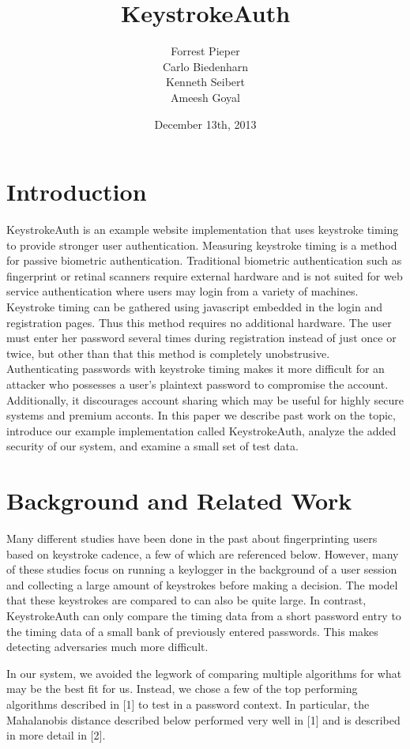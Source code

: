 \documentclass{article}
\title{KeystrokeAuth}
\author{
  Forrest Pieper\\
  Carlo Biedenharn\\
  Kenneth Seibert\\
  Ameesh Goyal
}
\date{December 13th, 2013}
\begin{document}
\maketitle

\abstract{
}

\section{Introduction}
\label{introduction}
KeystrokeAuth is an example website implementation that uses keystroke timing to provide stronger user authentication.
Measuring keystroke timing is a method for passive biometric authentication. 
Traditional biometric authentication such as fingerprint or retinal scanners require external hardware and is not suited for web service authentication where users may login from a variety of machines. 
Keystroke timing can be gathered using javascript embedded in the login and registration pages.
Thus this method requires no additional hardware.
The user must enter her password several times during registration instead of just once or twice, but other than that this method is completely unobstrusive.
Authenticating passwords with keystroke timing makes it more difficult for an attacker who possesses a user's plaintext password to compromise the account.
Additionally, it discourages account sharing which may be useful for highly secure systems and premium acconts.
In this paper we describe past work on the topic, introduce our example implementation called KeystrokeAuth, analyze the added security of our system, and examine a small set of test data.

\section{Background and Related Work}

Many different studies have been done in the past about fingerprinting users based on keystroke cadence, a few of which are referenced below. However, many of these studies focus on running a keylogger in the background of a user session and collecting a large amount of keystrokes before making a decision. The model that these keystrokes are compared to can also be quite large. In contrast, KeystrokeAuth can only compare the timing data from a short password entry to the timing data of a small bank of previously entered passwords. This makes detecting adversaries much more difficult.

In our system, we avoided the legwork of comparing multiple algorithms for what may be the best fit for us. Instead, we chose a few of the top performing algorithms described in {[}1{]} to test in a password context. In particular, the Mahalanobis distance described below performed very well in {[}1{]} and is described in more detail in {[}2{]}. 
\end{document}
